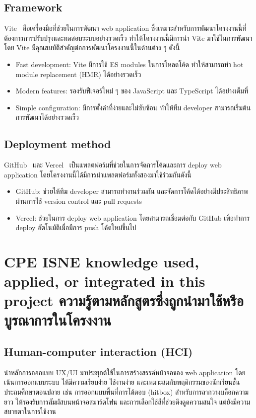     \subsection{Framework}
    Vite~\cite{vite} คือเครื่องมือที่ช่วยในการพัฒนา web application ซึ่งเหมาะสำหรับการพัฒนาโครงงานนี้ที่ต้องการการปรับปรุงและทดสอบระบบอย่างรวดเร็ว
    ทำให้โครงงานนี้มีการนำ Vite มาใช้ในการพัฒนา โดย Vite มีคุณสมบัติสำคัญต่อการพัฒนาโครงงานนี้ในด้านต่าง ๆ ดังนี้
    \begin{itemize}
        \item Fast development: Vite มีการใช้ ES modules ในการโหลดโค้ด ทำให้สามารถทำ hot module replacement (HMR) ได้อย่างรวดเร็ว
        \item Modern features: รองรับฟีเจอร์ใหม่ ๆ ของ JavaScript และ TypeScript ได้อย่างเต็มที่
        \item Simple configuration: มีการตั้งค่าที่ง่ายและไม่ซับซ้อน ทำให้ทีม developer สามารถเริ่มต้นการพัฒนาได้อย่างรวดเร็ว
    \end{itemize}

    \subsection{Deployment method}
    GitHub~\cite{GitHub} และ Vercel~\cite{vercel} เป็นแพลตฟอร์มที่ช่วยในการจัดการโค้ดและการ deploy web application โดยโครงงานนี้ได้มีการนำแพลตฟอร์มทั้งสองมาใช้ร่วมกันดังนี้
    \begin{itemize}
        \item GitHub: ช่วยให้ทีม developer สามารถทำงานร่วมกัน และจัดการโค้ดได้อย่างมีประสิทธิภาพผ่านการใช้ version control และ pull requests
        \item Vercel: ช่วยในการ deploy web application โดยสามารถเชื่อมต่อกับ GitHub เพื่อทำการ deploy อัตโนมัติเมื่อมีการ push โค้ดใหม่ขึ้นไป
    \end{itemize}

\section{\ifenglish%
\ifcpe CPE \else ISNE \fi knowledge used, applied, or integrated in this project
\else%
ความรู้ตามหลักสูตรซึ่งถูกนำมาใช้หรือบูรณาการในโครงงาน
\fi
}%
    \subsection{Human-computer interaction (HCI)}%
    นำหลักการออกแบบ UX/UI มาประยุกต์ใช้ในการสร้างสรรค์หน้าจอของ web application โดยเน้นการออกแบบระบบ
    ให้มีความเรียบง่าย ใช้งานง่าย และเหมาะสมกับพฤติกรรมของนักเรียนชั้นประถมศึกษาตอนปลาย เช่น การออกแบบพื้นที่การโต้ตอบ (hitbox) สำหรับการลากวางบล็อกความยาว
    ให้รองรับการสัมผัสบนหน้าจอสมาร์ตโฟน และการเลือกใช้สีที่ช่วยดึงดูดความสนใจ แต่ยังมีความสบายตาในการใช้งาน

